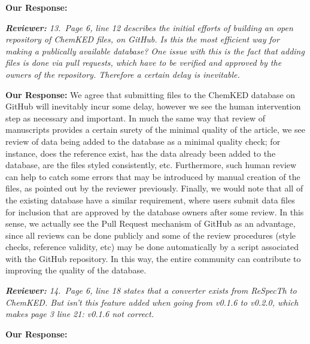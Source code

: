 \documentclass[a4paper,10pt]{elsarticle}
\newenvironment{reviewer}{\vspace{0.5\baselineskip}\begingroup\itshape\textbf{Reviewer:}}{\endgroup\vspace{0.5\baselineskip}}
\newenvironment{response}{\vspace{0.5\baselineskip}\textbf{Our Response:}}{\vspace{0.5\baselineskip}}
\begin{document}
\begin{response}

\end{response}

\begin{reviewer}
    13.~Page 6, line 12 describes the initial efforts of building an open repository of ChemKED
    files, on GitHub. Is this the most efficient way for making a publically available database? One
    issue with this is the fact that adding files is done via pull requests, which have to be
    verified and approved by the owners of the repository. Therefore a certain delay is inevitable.
\end{reviewer}

\begin{response}
    We agree that submitting files to the ChemKED database on GitHub will inevitably incur some
    delay, however we see the human intervention step as necessary and important. In much the same
    way that review of manuscripts provides a certain surety of the minimal quality of the article,
    we see review of data being added to the database as a minimal quality check; for instance, does
    the reference exist, has the data already been added to the database, are the files styled
    consistently, etc. Furthermore, such human review can help to catch some errors that may be
    introduced by manual creation of the files, as pointed out by the reviewer previously. Finally,
    we would note that all of the existing database have a similar requirement, where users submit
    data files for inclusion that are approved by the database owners after some review. In this
    sense, we actually see the Pull Request mechanism of GitHub as an advantage, since all reviews
    can be done publicly and some of the review procedures (style checks, reference validity, etc)
    may be done automatically by a script associated with the GitHub repository. In this way, the
    entire community can contribute to improving the quality of the database.
\end{response}

\begin{reviewer}
    14.~Page 6, line 18 states that a converter exists from ReSpecTh to ChemKED. But isn't this
    feature added when going from v0.1.6 to v0.2.0, which makes page 3 line 21: v0.1.6 not correct.
\end{reviewer}

\begin{response}

\end{response}
\end{document}
